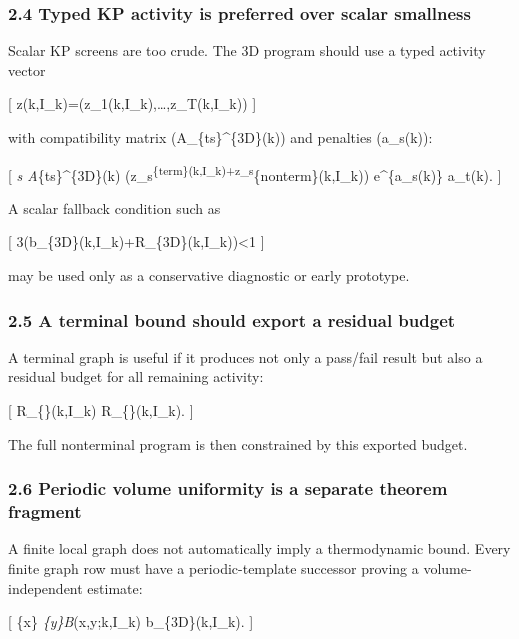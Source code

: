 \documentclass[
]{article}
\begin{document}
\subsubsection{2.4 Typed KP activity is preferred over scalar
smallness}\label{typed-kp-activity-is-preferred-over-scalar-smallness}

Scalar KP screens are too crude. The 3D program should use a typed
activity vector

{[} \mathbf z(k,I\_k)=\left(z\_1(k,I\_k),\ldots,z\_T(k,I\_k)\right) {]}

with compatibility matrix (A\_\{ts\}\^{}\{3D\}(k)) and penalties
(a\_s(k)):

{[} \sum\emph{s A}\{ts\}\^{}\{3D\}(k)
\Bigl(z\_s\textsuperscript{\{\rm term\}(k,I\_k)+z\_s}\{\rm nonterm\}(k,I\_k)\Bigr)
e\^{}\{a\_s(k)\} \le a\_t(k). {]}

A scalar fallback condition such as

{[} 3\bigl(b\_\{3D\}(k,I\_k)+R\_\{3D\}(k,I\_k)\bigr)\textless1 {]}

may be used only as a conservative diagnostic or early prototype.

\subsubsection{2.5 A terminal bound should export a residual
budget}\label{a-terminal-bound-should-export-a-residual-budget}

A terminal graph is useful if it produces not only a pass/fail result
but also a residual budget for all remaining activity:

{[} R\_\{\max\}(k,I\_k) \quad{}\quad \mathbf R\_\{\max\}(k,I\_k).
{]}

The full nonterminal program is then constrained by this exported
budget.

\subsubsection{2.6 Periodic volume uniformity is a separate theorem
fragment}\label{periodic-volume-uniformity-is-a-separate-theorem-fragment}

A finite local graph does not automatically imply a thermodynamic bound.
Every finite graph row must have a periodic-template successor proving a
volume-independent estimate:

{[} \sup\emph{\Lambda\sup}\{x\in\Lambda\}
\sum\emph{\{y\in\Lambda\}B}\Lambda(x,y;k,I\_k) \le b\_\{3D\}(k,I\_k).
{]}
\end{document}
